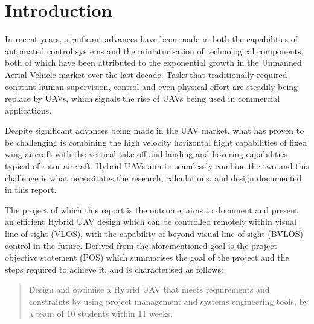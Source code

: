 \chapter{Introduction}
\setlength{\parindent}{15pt}
\label{ch:intr}

In recent years, significant advances have been made in both the capabilities of automated control systems and the miniaturisation of technological components, both of which have been attributed to the exponential growth in the Unmanned Aerial Vehicle market over the last decade. Tasks that traditionally required constant human supervision, control and even physical effort are steadily being replace by UAVs, which signals the rise of UAVs being used in commercial applications.

Despite significant advances being made in the UAV market, what has proven to be challenging is combining the high velocity horizontal flight capabilities of fixed wing aircraft with the vertical take-off and landing and hovering capabilities typical of rotor aircraft. Hybrid UAVs aim to seamlessly combine the two and this challenge is what necessitates the research, calculations, and design documented in this report.

The project of which this report is the outcome, aims to document and present an efficient Hybrid UAV design which can be controlled remotely within visual line of sight (VLOS), with the capability of beyond visual line of sight (BVLOS) control in the future. Derived from the aforementioned goal is the project objective statement (POS) which summarises the goal of the project and the steps required to achieve it, and is characterised as follows:


\begin{quote}
	\begin{itshape}
	Design and optimise a Hybrid UAV that meets requirements and constraints by using project management and systems engineering tools, by a team of 10 students within 11 weeks.
	\end{itshape}
\end{quote}

